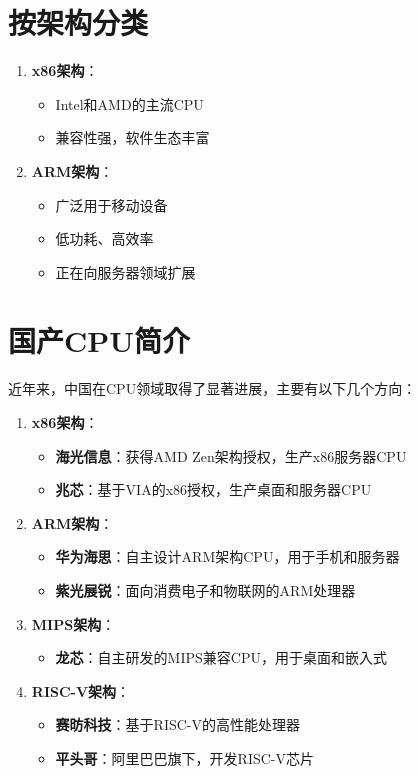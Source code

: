 \documentclass[12pt,UTF8]{ctexbook}
\begin{document}
\section{按架构分类}

\begin{enumerate}
    \item \textbf{x86架构}：
    \begin{itemize}[leftmargin=2em]
        \item Intel和AMD的主流CPU
        \item 兼容性强，软件生态丰富
    \end{itemize}
    
    \item \textbf{ARM架构}：
    \begin{itemize}[leftmargin=2em]
        \item 广泛用于移动设备
        \item 低功耗、高效率
        \item 正在向服务器领域扩展
    \end{itemize}
\end{enumerate}

\section{国产CPU简介}

近年来，中国在CPU领域取得了显著进展，主要有以下几个方向：

\begin{enumerate}
    \item \textbf{x86架构}：
    \begin{itemize}[leftmargin=2em]
        \item \textbf{海光信息}：获得AMD Zen架构授权，生产x86服务器CPU
        \item \textbf{兆芯}：基于VIA的x86授权，生产桌面和服务器CPU
    \end{itemize}
    
    \item \textbf{ARM架构}：
    \begin{itemize}[leftmargin=2em]
        \item \textbf{华为海思}：自主设计ARM架构CPU，用于手机和服务器
        \item \textbf{紫光展锐}：面向消费电子和物联网的ARM处理器
    \end{itemize}
    
    \item \textbf{MIPS架构}：
    \begin{itemize}[leftmargin=2em]
        \item \textbf{龙芯}：自主研发的MIPS兼容CPU，用于桌面和嵌入式
    \end{itemize}
    
    \item \textbf{RISC-V架构}：
    \begin{itemize}[leftmargin=2em]
        \item \textbf{赛昉科技}：基于RISC-V的高性能处理器
        \item \textbf{平头哥}：阿里巴巴旗下，开发RISC-V芯片
    \end{itemize}
\end{enumerate}
\end{document}
